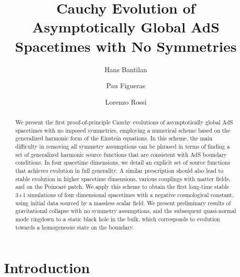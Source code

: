 \documentclass[aps,letterpaper,twocolumn,nofootinbib]{revtex4}
\numberwithin{equation}{section}
\begin{document}
\title{Cauchy Evolution of Asymptotically Global AdS Spacetimes with No Symmetries}
\author{Hans Bantilan}
\author{Pau Figueras}
\author{Lorenzo Rossi}
		
\begin{abstract}
We present the first proof-of-principle Cauchy evolutions of asymptotically global AdS spacetimes with no imposed symmetries, employing a numerical scheme based on the generalized harmonic form of the Einstein equations.
In this scheme, the main difficulty in removing all symmetry assumptions can be phrased in terms of finding a set of generalized harmonic source functions that are consistent with AdS boundary conditions.
In four spacetime dimensions, we detail an explicit set of source functions that achieves evolution in full generality.
A similar prescription should also lead to stable evolution in higher spacetime dimensions, various couplings with matter fields, and on the Poincar\'{e} patch.
We apply this scheme to obtain the first long-time stable 3+1 simulations of four dimensional spacetimes with a negative cosmological constant, using initial data sourced by a massless scalar field.
We present preliminary results of gravitational collapse with no symmetry assumptions, and the subsequent quasi-normal mode ringdown to a static black hole in the bulk, which corresponds to evolution towards a homogeneous state on the boundary.
\end{abstract}

\maketitle


\section{Introduction}
\end{document}
